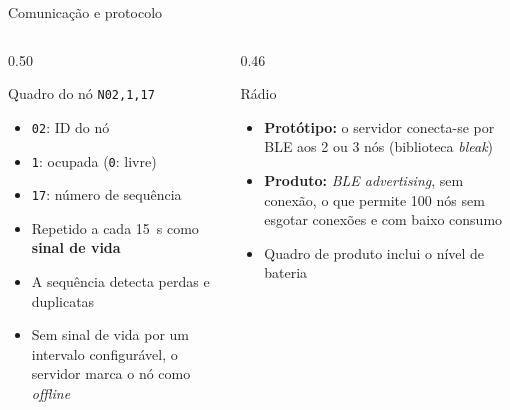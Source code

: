 \documentclass[aspectratio=169,11pt]{beamer}
\begin{document}
\begin{frame}[t]{Comunicação e protocolo}
  \begin{columns}[T]
    \begin{column}{0.50\textwidth}
      \begin{block}{Quadro do nó}
        \footnotesize
        \texttt{N02,1,17}
        \begin{itemize}
          \item \texttt{02}: ID do nó
          \item \texttt{1}: ocupada (\texttt{0}: livre)
          \item \texttt{17}: número de sequência
          \item Repetido a cada 15~s como \textbf{sinal de vida}
          \item A sequência detecta perdas e duplicatas
          \item Sem sinal de vida por um intervalo configurável, o servidor marca o nó como \emph{offline}
        \end{itemize}
      \end{block}
    \end{column}
    \begin{column}{0.46\textwidth}
      \begin{block}{Rádio}
        \footnotesize
        \begin{itemize}
          \item \textbf{Protótipo:} o servidor conecta-se por BLE aos 2 ou 3 nós (biblioteca \emph{bleak})
          \item \textbf{Produto:} \emph{BLE advertising}, sem conexão, o que permite 100 nós sem esgotar conexões e com baixo consumo
          \item Quadro de produto inclui o nível de bateria
        \end{itemize}
      \end{block}
    \end{column}
  \end{columns}
\end{frame}
\end{document}
